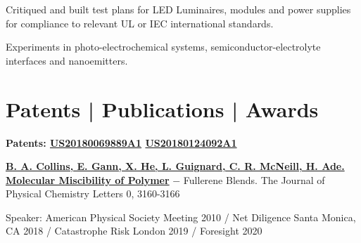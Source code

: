 \documentclass[letterpaper]{deedy-resume} %
\begin{document}
\begin{minipage}[t]{0.66\textwidth}
\sectionspace %
\vspace{\topsep} %

Critiqued and built test plans for LED Luminaires, modules and power supplies for compliance to relevant UL or IEC international standards. 


\sectionspace %

Experiments in photo-electrochemical systems, semiconductor-electrolyte interfaces and nanoemitters. 


\sectionspace %
\sectionspace %




\section{Patents | Publications | Awards}
\vspace{\topsep} %
\begin{tightitemize}
\item {\bf Patents: \href{https://patents.google.com/patent/US20180069889A1/en?oq=US20180069889A1}{US20180069889A1} \href{https://patents.google.com/patent/US20180124092A1/en?oq=US20180124092A1}{US20180124092A1}}
\item \href{https://pubs.acs.org/doi/abs/10.1021/jz101276h}{\bf B. A. Collins, E. Gann, X. He, L. Guignard, C. R. McNeill, H. Ade. Molecular Miscibility of Polymer}
− Fullerene Blends. The Journal of Physical Chemistry Letters 0, 3160-3166
\item Speaker: American Physical Society Meeting 2010 / Net Diligence Santa Monica, CA 2018 / Catastrophe Risk London 2019 / Foresight 2020
\end{tightitemize}



\end{minipage}
\end{document}
